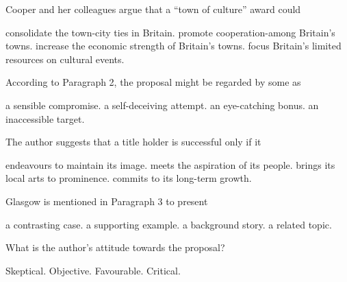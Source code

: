 \item Cooper and her colleagues argue that a ``town of culture'' award could
\begin{tasks}
	\task consolidate the town-city ties in Britain.
	\task promote cooperation-among Britain's towns.
	\task increase the economic strength of Britain's towns.
	\task focus Britain's limited resources on cultural events.
\end{tasks}
\item According to Paragraph 2, the proposal might be regarded by some as
\begin{tasks}
	\task a sensible compromise.
	\task a self-deceiving attempt.
	\task an eye-catching bonus.
	\task an inaccessible target.
\end{tasks}
\item The author suggests that a title holder is successful only if it
\begin{tasks}
	\task endeavours to maintain its image.
	\task meets the aspiration of its people.
	\task brings its local arts to prominence.
	\task commits to its long-term growth.
\end{tasks}
\item Glasgow is mentioned in Paragraph 3 to present
\begin{tasks}
	\task a contrasting case.
	\task a supporting example.
	\task a background story.
	\task a related topic.
\end{tasks}
\item What is the author's attitude towards the proposal?
\begin{tasks}
	\task Skeptical.
	\task Objective.
	\task Favourable.
	\task Critical.
\end{tasks}
